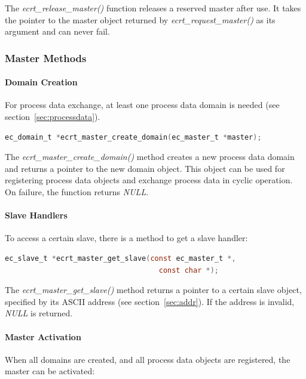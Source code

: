 \documentclass[a4paper,12pt,BCOR6mm,bibtotoc,idxtotoc]{scrbook}
\begin{document}
The \textit{ecrt\_release\_master()} function releases a reserved
master after use. It takes the pointer to the master object returned
by \textit{ecrt\_request\_master()} as its argument and can never
fail.

\subsubsection{Master Methods}
\label{sec:ecrt-master}

\paragraph{Domain Creation}

For process data exchange, at least one process data domain is needed
(see section~\ref{sec:processdata}).

\begin{lstlisting}[language=C]
  ec_domain_t *ecrt_master_create_domain(ec_master_t *master);
\end{lstlisting}

The \textit{ecrt\_master\_create\_domain()} method creates a new
process data domain and returns a pointer to the new domain object.
This object can be used for registering process data objects and
exchange process data in cyclic operation. On failure, the function
returns \textit{NULL}.

\paragraph{Slave Handlers}

To access a certain slave, there is a method to get a slave handler:

\begin{lstlisting}[language=C]
  ec_slave_t *ecrt_master_get_slave(const ec_master_t *,
                                    const char *);
\end{lstlisting}

The \textit{ecrt\_master\_get\_slave()} method returns a pointer to a
certain slave object, specified by its ASCII address (see
section~\ref{sec:addr}). If the address is invalid, \textit{NULL} is
returned.

\paragraph{Master Activation}

When all domains are created, and all process data objects are
registered, the master can be activated:
\end{document}
